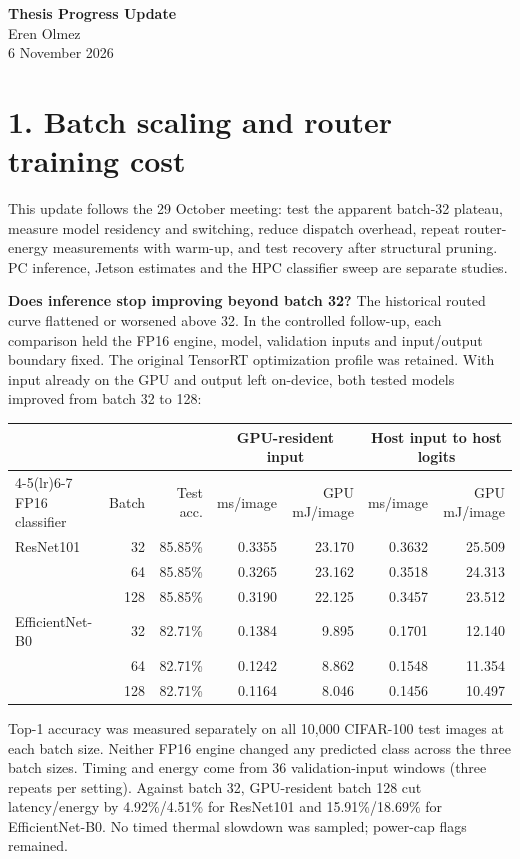 \documentclass[10pt,a4paper]{article}
\newcommand{\heading}[1]{\section*{\color{navy}#1}}
\newcommand{\smallcap}[1]{{\footnotesize\color{navy}#1}\par}
\begin{document}
\begin{center}
{\Large\bfseries\color{navy}Thesis Progress Update}\\[3 pt]
{Eren Olmez}\\{6 November 2026}
\end{center}\vspace{-8 pt}
\heading{1. Batch scaling and router training cost}
This update follows the 29 October meeting: test the apparent batch-32 plateau, measure model residency and switching, reduce dispatch overhead, repeat router-energy measurements with warm-up, and test recovery after structural pruning. PC inference, Jetson estimates and the HPC classifier sweep are separate studies.

\textbf{Does inference stop improving beyond batch 32?}
The historical routed curve flattened or worsened above 32. In the controlled follow-up, each comparison held the FP16 engine, model, validation inputs and input/output boundary fixed. The original TensorRT optimization profile was retained. With input already on the GPU and output left on-device, both tested models improved from batch 32 to 128:

\begin{center}\small
\begin{tabular}{@{}lrrrrrr@{}}\toprule
 & & & \multicolumn{2}{c}{GPU-resident input} & \multicolumn{2}{c}{Host input to host logits}\\
\cmidrule(lr){4-5}\cmidrule(lr){6-7}
FP16 classifier & Batch & Test acc. & ms/image & GPU mJ/image & ms/image & GPU mJ/image\\
\midrule
ResNet101 & 32 & 85.85\% & 0.3355 & 23.170 & 0.3632 & 25.509\\
 & 64 & 85.85\% & 0.3265 & 23.162 & 0.3518 & 24.313\\
 & 128 & 85.85\% & 0.3190 & 22.125 & 0.3457 & 23.512\\
EfficientNet-B0 & 32 & 82.71\% & 0.1384 & 9.895 & 0.1701 & 12.140\\
 & 64 & 82.71\% & 0.1242 & 8.862 & 0.1548 & 11.354\\
 & 128 & 82.71\% & 0.1164 & 8.046 & 0.1456 & 10.497\\
\bottomrule\end{tabular}
\end{center}
\smallcap{Top-1 accuracy was measured separately on all 10,000 CIFAR-100 test images at each batch size. Neither FP16 engine changed any predicted class across the three batch sizes. Timing and energy come from 36 validation-input windows (three repeats per setting). Against batch 32, GPU-resident batch 128 cut latency/energy by 4.92\%/4.51\% for ResNet101 and 15.91\%/18.69\% for EfficientNet-B0. No timed thermal slowdown was sampled; power-cap flags remained.}
\end{document}
